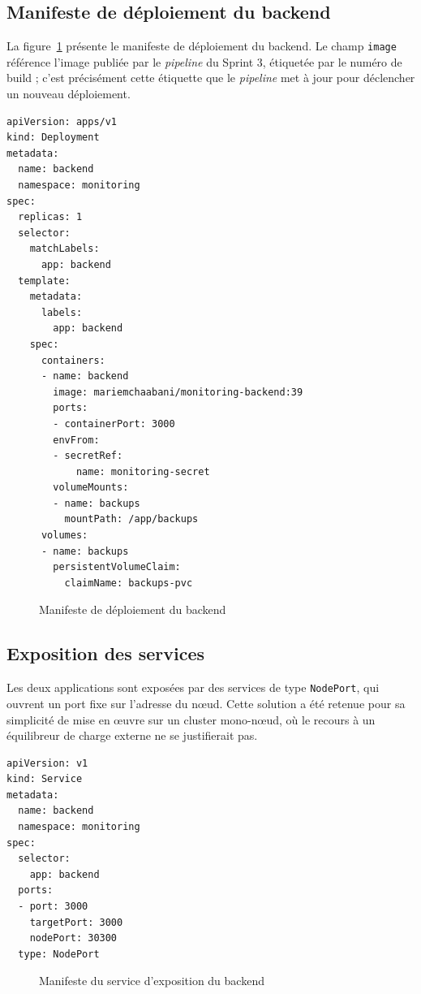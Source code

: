 \subsection{Manifeste de déploiement du backend}
La figure~\ref{fig:manifest-back} présente le manifeste de déploiement du backend. Le
champ \texttt{image} référence l'image publiée par le \textit{pipeline} du Sprint 3,
étiquetée par le numéro de build ; c'est précisément cette étiquette que le
\textit{pipeline} met à jour pour déclencher un nouveau déploiement.

\begin{lrbox}{\manifbox}
\begin{minipage}{0.88\textwidth}
\begin{verbatim}
apiVersion: apps/v1
kind: Deployment
metadata:
  name: backend
  namespace: monitoring
spec:
  replicas: 1
  selector:
    matchLabels:
      app: backend
  template:
    metadata:
      labels:
        app: backend
    spec:
      containers:
      - name: backend
        image: mariemchaabani/monitoring-backend:39
        ports:
        - containerPort: 3000
        envFrom:
        - secretRef:
            name: monitoring-secret
        volumeMounts:
        - name: backups
          mountPath: /app/backups
      volumes:
      - name: backups
        persistentVolumeClaim:
          claimName: backups-pvc
\end{verbatim}
\end{minipage}
\end{lrbox}
\begin{figure}[H]
\centering
\fbox{\usebox{\manifbox}}
\caption{Manifeste de déploiement du backend}
\label{fig:manifest-back}
\end{figure}

\subsection{Exposition des services}
Les deux applications sont exposées par des services de type \texttt{NodePort}, qui
ouvrent un port fixe sur l'adresse du n\oe ud. Cette solution a été retenue pour sa
simplicité de mise en \oe uvre sur un cluster mono-n\oe ud, où le recours à un
équilibreur de charge externe ne se justifierait pas.

\begin{lrbox}{\manifbox}
\begin{minipage}{0.88\textwidth}
\begin{verbatim}
apiVersion: v1
kind: Service
metadata:
  name: backend
  namespace: monitoring
spec:
  selector:
    app: backend
  ports:
  - port: 3000
    targetPort: 3000
    nodePort: 30300
  type: NodePort
\end{verbatim}
\end{minipage}
\end{lrbox}
\begin{figure}[H]
\centering
\fbox{\usebox{\manifbox}}
\caption{Manifeste du service d'exposition du backend}
\label{fig:manifest-svc}
\end{figure}

